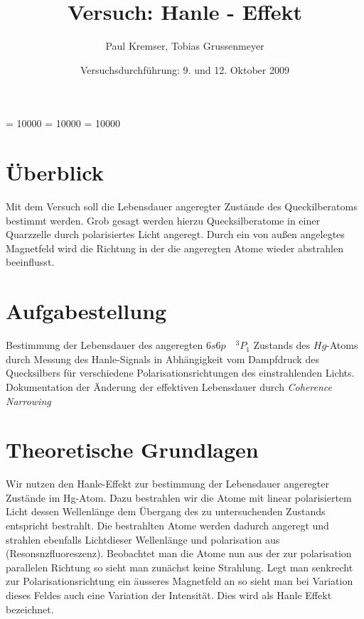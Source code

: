\documentclass[12pt]{article}
\newcommand{\changefont}[3]{
\fontfamily{#1} \fontseries{#2} \fontshape{#3} \selectfont}
\begin{document}
\clubpenalty = 10000
\widowpenalty = 10000 
\displaywidowpenalty = 10000

\onehalfspacing
\changefont{ptm}{m}{n} 

\begin{titlepage}
\author{Paul Kremser, Tobias Grussenmeyer}
\title{Versuch: Hanle - Effekt}
\date{Versuchsdurchführung: 9. und 12. Oktober 2009} 
\maketitle
\thispagestyle{empty}
\end{titlepage}


\tableofcontents
\thispagestyle{empty}
\newpage
{}
\section{Überblick}
Mit dem Versuch soll die Lebensdauer angeregter Zustände des Queckilberatoms bestimmt werden. Grob gesagt werden hierzu Quecksilberatome in einer 
Quarzzelle durch polarisiertes Licht angeregt. Durch ein von außen angelegtes Magnetfeld wird die Richtung
in der die angeregten Atome wieder abstrahlen beeinflusst.

\section{Aufgabestellung}
Bestimmung der Lebensdauer des angeregten $6s6p \quad ^3P_1$ Zustands des $Hg$-Atoms durch Messung des Hanle-Signals in Abhängigkeit vom Dampfdruck
des Quecksilbers für verschiedene Polarisationsrichtungen des einstrahlenden Lichts. Dokumentation der Änderung der effektiven Lebensdauer durch
\textit{Coherence Narrowing}

\section{Theoretische Grundlagen}

Wir nutzen den Hanle-Effekt zur bestimmung der Lebensdauer angeregter  Zustände im Hg-Atom. Dazu bestrahlen wir die Atome mit linear polarisiertem Licht dessen Wellenlänge dem Übergang des zu untersuchenden Zustands entspricht bestrahlt. Die bestrahlten Atome werden dadurch angeregt und strahlen ebenfalls Lichtdieser Wellenlänge und polarisation aus (Resonsnzfluoreszenz). Beobachtet man die Atome nun aus der zur polarisation parallelen Richtung so sieht man zunächst keine Strahlung. Legt man senkrecht zur Polarisationsrichtung ein äusseres Magnetfeld an so sieht man bei Variation dieses Feldes auch eine Variation der Intensität. Dies wird als Hanle Effekt bezeichnet.
\end{document}
